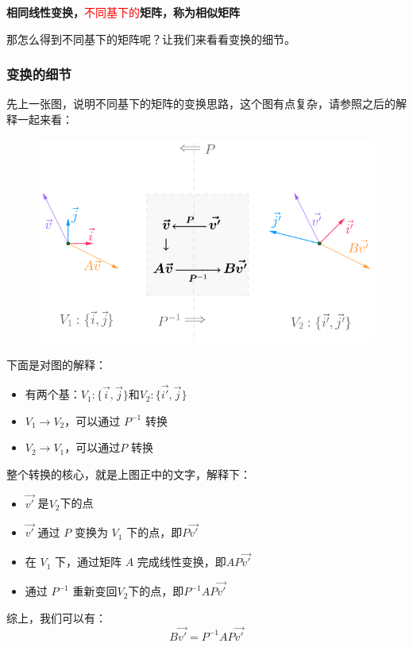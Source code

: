 \documentclass[12pt]{article}
\begin{document}
\begin{center}
\textbf{相同线性变换，}\textcolor{red}{不同基下的}\textbf{矩阵，称为相似矩阵}
\end{center}

那怎么得到不同基下的矩阵呢？让我们来看看变换的细节。

\subsubsection{变换的细节}
先上一张图，说明不同基下的矩阵的变换思路，这个图有点复杂，请参照之后的解释一起来看：
\begin{figure}[H]
    \centering
    \includegraphics[width=.8\textwidth]{fig/UnderstandSimilarMatrix_3.png}
\end{figure} 

下面是对图的解释：
\begin{itemize}
    \item 有两个基：$V_1:\{\vec{i},\vec{j}\}$和$V_2:\{\vec{i'}, \vec{j}\}$
    \item $V_1 \rightarrow V_2$，可以通过 $P^{-1}$ 转换
    \item $V_2 \rightarrow V_1$，可以通过$P$ 转换
\end{itemize}

整个转换的核心，就是上图正中的文字，解释下：
\begin{itemize}
    \item $\vec{v'}$ 是$V_2$下的点
    \item $\vec{v'}$ 通过 $P$ 变换为 $V_1$ 下的点，即$P\vec{v'}$
    \item 在 $V_1$ 下，通过矩阵 $A$ 完成线性变换，即$AP\vec{v'}$
    \item 通过 $P^{-1}$ 重新变回$V_2$下的点，即$P^{-1}AP\vec{v'}$
\end{itemize}

综上，我们可以有：
$$
B\vec{v'} = P^{-1}AP\vec{v'}
$$
\end{document}
